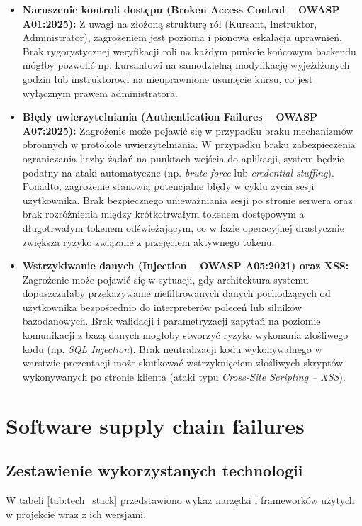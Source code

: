 \documentclass[12pt,twoside]{article}
\begin{document}
\begin{itemize}
    \item \textbf{Naruszenie kontroli dostępu (Broken Access Control -- OWASP A01:2025):} Z uwagi na złożoną strukturę ról (Kursant, Instruktor, Administrator), zagrożeniem jest pozioma i pionowa eskalacja uprawnień. Brak rygorystycznej weryfikacji roli na każdym punkcie końcowym backendu mógłby pozwolić np. kursantowi na samodzielną modyfikację wyjeżdżonych godzin lub instruktorowi na nieuprawnione usunięcie kursu, co jest wyłącznym prawem administratora.
    \item \textbf{Błędy uwierzytelniania (Authentication Failures -- OWASP A07:2025):} Zagrożenie może pojawić się w przypadku braku mechanizmów obronnych w protokole uwierzytelniania. W przypadku braku zabezpieczenia ograniczania liczby żądań na punktach wejścia do aplikacji, system będzie podatny na ataki automatyczne (np. \textit{brute-force} lub \textit{credential stuffing}). Ponadto, zagrożenie stanowią potencjalne błędy w cyklu życia sesji użytkownika. Brak bezpiecznego unieważniania sesji po stronie serwera oraz brak rozróżnienia między krótkotrwałym tokenem dostępowym a długotrwałym tokenem odświeżającym, co w fazie operacyjnej drastycznie zwiększa ryzyko związane z przejęciem aktywnego tokenu.
    \item \textbf{Wstrzykiwanie danych (Injection -- OWASP A05:2021) oraz XSS:} Zagrożenie może pojawić się w sytuacji, gdy architektura systemu dopuszczałaby przekazywanie niefiltrowanych danych pochodzących od użytkownika bezpośrednio do interpreterów poleceń lub silników bazodanowych. Brak walidacji i parametryzacji zapytań na poziomie komunikacji z bazą danych mogłoby stworzyć ryzyko wykonania złośliwego kodu (np. \textit{SQL Injection}). Brak neutralizacji kodu wykonywalnego w warstwie prezentacji może skutkować wstrzyknięciem złośliwych skryptów wykonywanych po stronie klienta (ataki typu \textit{Cross-Site Scripting -- XSS}).
\end{itemize}

\clearpage

\section{Software supply chain failures}

\subsection{Zestawienie wykorzystanych technologii}
W tabeli \ref{tab:tech_stack} przedstawiono wykaz narzędzi i frameworków użytych w projekcie wraz z ich wersjami.
\end{document}
